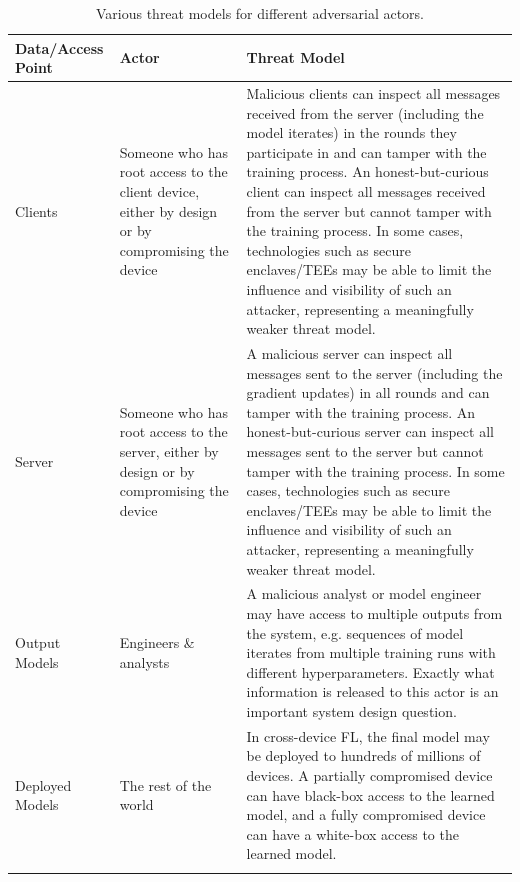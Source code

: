 \documentclass[11pt]{article}
\begin{document}
\begin{table}
\renewcommand{\arraystretch}{1.2}
\begin{center} 
\begin{tabular}{@{}p{1.2in} p{1.85in}  p{3in}@{}}
\toprule
\textbf{Data/Access Point} & \textbf{Actor} & \textbf{Threat Model} \\
\midrule
\addlinespace[0.05in]
Clients & 
Someone who has root access to the client device, either by design or by compromising the device &
Malicious clients can inspect all messages received from the server (including the model iterates) in the rounds they participate in and can tamper with the training process.  An honest-but-curious client can inspect all messages received from the server but cannot tamper with the training process.   In some cases, technologies such as secure enclaves/TEEs may be able to limit the influence and visibility of such an attacker, representing a meaningfully weaker threat model.
\\ 
\addlinespace[0.1in]
Server & 
Someone who has root access to the server, either by design or by compromising the device &
A malicious server can inspect all messages sent to the server (including the gradient updates) in all rounds and can tamper with the training process. An honest-but-curious server can inspect all messages sent to the server but cannot tamper with the training process.  In some cases, technologies such as secure enclaves/TEEs may be able to limit the influence and visibility of such an attacker, representing a meaningfully weaker threat model.
\\ 
\addlinespace[0.1in]
Output Models &
Engineers \& analysts & 
A malicious analyst or model engineer may have access to multiple outputs from the system, e.g. sequences of model iterates from multiple training runs with different hyperparameters. Exactly what information is released to this actor is an important system design question. 
\\
\addlinespace[0.1in]
Deployed Models &
The rest of the world & 
In cross-device FL, the final model may be deployed to hundreds of millions of devices. A partially compromised device can have black-box access to the learned model, and a fully compromised device can have a white-box access to the learned model.
\\ 
\addlinespace[0.05in]
\bottomrule
\end{tabular} 
\end{center}
\caption{Various threat models for different adversarial actors.} 
\label{table:actors_and_threats}
 \end{table}
\end{document}
